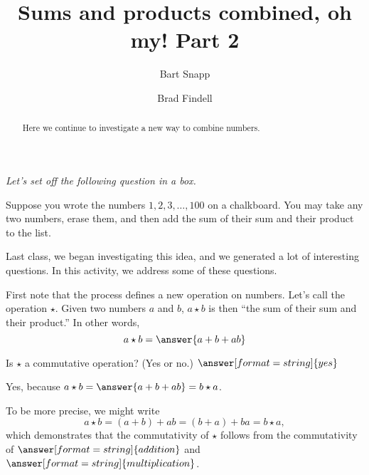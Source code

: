 \documentclass{ximera}
\title{Sums and products combined, oh my!  Part 2}
\author{Bart Snapp \and Brad Findell}
\begin{document}
\begin{abstract}
Here we continue to investigate a new way to combine numbers.
\end{abstract}
\maketitle

\emph{Let's set off the following question in a box.} 

Suppose you wrote the numbers $1,2,3,\dots,100$ on a chalkboard. You
may take any two numbers, erase them, and then add the sum of their
sum and their product to the list.

Last class, we began investigating this idea, and we generated a lot of interesting questions.  
In this activity, we address some of these questions.  

\begin{problem}
First note that the process defines a new operation on numbers.  Let's call the operation $\star$.  Given two numbers $a$ and $b$,  $a\star b$ is then ``the sum of their sum and their product.''    In other words, 
\[
a\star b = \answer{a+b+ab}
\]
\end{problem}

\begin{problem}
Is $\star$ a commutative operation?  (Yes or no.) $\answer[format=string]{yes}$

\begin{explanation}
Yes, because $a\star b = \answer{a+b+ab}  = b\star a$.  

\begin{question}
To be more precise, we might write 
\[
a\star b = (a+b)+ab= (b+a)+ba = b\star a,
\]
which demonstrates that the commutativity of $\star$ follows from the commutativity of 
$\answer[format=string]{addition}$ and $\answer[format=string]{multiplication}$. 
\end{question}
\end{explanation}
\end{problem}
\end{document}
